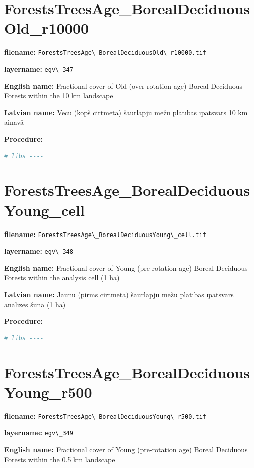\documentclass[
]{book}
\newcommand{\passthrough}[1]{#1}
\begin{document}
\section{ForestsTreesAge\_BorealDeciduousOld\_r10000}\label{ch06.347}

\textbf{filename:} \passthrough{\lstinline!ForestsTreesAge\_BorealDeciduousOld\_r10000.tif!}

\textbf{layername:} \passthrough{\lstinline!egv\_347!}

\textbf{English name:} Fractional cover of Old (over rotation age) Boreal Deciduous Forests within the 10 km landscape

\textbf{Latvian name:} Vecu (kopš cirtmeta) šaurlapju mežu platības īpatsvars 10 km ainavā

\textbf{Procedure:}

\begin{lstlisting}[language=R]
# libs ----
\end{lstlisting}

\section{ForestsTreesAge\_BorealDeciduousYoung\_cell}\label{ch06.348}

\textbf{filename:} \passthrough{\lstinline!ForestsTreesAge\_BorealDeciduousYoung\_cell.tif!}

\textbf{layername:} \passthrough{\lstinline!egv\_348!}

\textbf{English name:} Fractional cover of Young (pre-rotation age) Boreal Deciduous Forests within the analysis cell (1 ha)

\textbf{Latvian name:} Jaunu (pirms cirtmeta) šaurlapju mežu platības īpatsvars analīzes šūnā (1 ha)

\textbf{Procedure:}

\begin{lstlisting}[language=R]
# libs ----
\end{lstlisting}

\section{ForestsTreesAge\_BorealDeciduousYoung\_r500}\label{ch06.349}

\textbf{filename:} \passthrough{\lstinline!ForestsTreesAge\_BorealDeciduousYoung\_r500.tif!}

\textbf{layername:} \passthrough{\lstinline!egv\_349!}

\textbf{English name:} Fractional cover of Young (pre-rotation age) Boreal Deciduous Forests within the 0.5 km landscape
\end{document}
